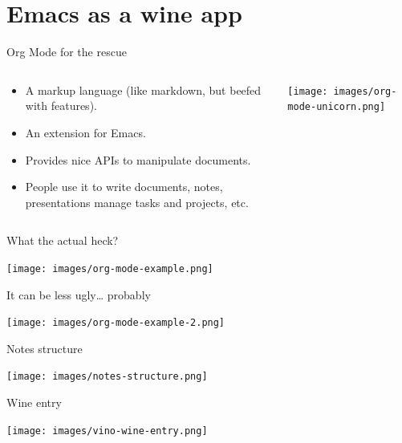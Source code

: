 \documentclass[presentation,aspectratio=169,smaller]{beamer}
\begin{document}
\section{Emacs as a wine app}
\label{sec:org0c500af}

\begin{frame}[label={sec:org3f1ce96}]{Org Mode for the rescue}
\begin{columns}
\begin{column}{0.75\columnwidth}
\begin{itemize}
\item A markup language (like markdown, but beefed with features).
\item An extension for Emacs.
\item Provides nice APIs to manipulate documents.
\item People use it to write documents, notes, presentations manage tasks and projects, etc.
\end{itemize}
\end{column}
\begin{column}{0.25\columnwidth}
\begin{center}
\texttt{[image: images/org-mode-unicorn.png]}
\end{center}
\end{column}
\end{columns}
\end{frame}
\begin{frame}[label={sec:orgbfa8082}]{What the actual heck?}
\begin{center}
\texttt{[image: images/org-mode-example.png]}
\end{center}
\end{frame}
\begin{frame}[label={sec:org4b2d72d}]{It can be less ugly\ldots{} probably}
\begin{center}
\texttt{[image: images/org-mode-example-2.png]}
\end{center}
\end{frame}
\begin{frame}[label={sec:org2da3899}]{Notes structure}
\begin{center}
\texttt{[image: images/notes-structure.png]}
\end{center}
\end{frame}
\begin{frame}[label={sec:orgc6934ac}]{Wine entry}
\begin{center}
\texttt{[image: images/vino-wine-entry.png]}
\end{center}
\end{frame}
\end{document}
